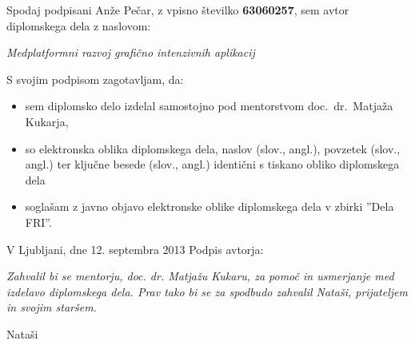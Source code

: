 \documentclass[a4paper, 12pt]{book}
\newcommand{\clearemptydoublepage}{\newpage{\pagestyle{empty}\cleardoublepage}}
\begin{document}
\vspace{1cm}
\noindent Spodaj podpisani Anže Pečar,
z vpisno številko \textbf{63060257}, sem avtor  diplomskega dela z naslovom:
   
\vspace{0.5cm}
\emph{Medplatformni razvoj grafično intenzivnih aplikacij}

\vspace{1.5cm}
\noindent S svojim podpisom zagotavljam, da:
\begin{itemize}
	\item sem diplomsko delo izdelal samostojno pod mentorstvom 
		doc.\ dr.\ Matjaža Kukarja,

	\item	so elektronska oblika diplomskega dela, naslov (slov., angl.), povzetek (slov., angl.) ter ključne besede (slov., angl.) identični s tiskano obliko diplomskega dela
	\item soglašam z javno objavo elektronske oblike diplomskega dela v zbirki ''Dela FRI''.
\end{itemize}

\vspace{1cm}
\noindent V Ljubljani, dne 12. septembra 2013 \hfill Podpis avtorja:

\clearemptydoublepage

\thispagestyle{empty}\mbox{}\vfill\null\it%
Zahvalil bi se mentorju, doc. dr.  Matjažu Kukaru, za pomoč in usmerjanje med izdelavo diplomskega dela. Prav tako bi se za spodbudo zahvalil Nataši, prijateljem in svojim staršem. 
\rm\normalfont

\clearemptydoublepage

\thispagestyle{empty}\mbox{}{\textheight}\mbox{}\hfill\begin{minipage}{0.55\textwidth}%
Nataši%
\normalfont\end{minipage}
 
\clearemptydoublepage

\def\thepage{}%
\tableofcontents{}


\clearemptydoublepage



\clearemptydoublepage

\mainmatter
\setcounter{page}{1}
\pagestyle{fancy}











\end{document}
